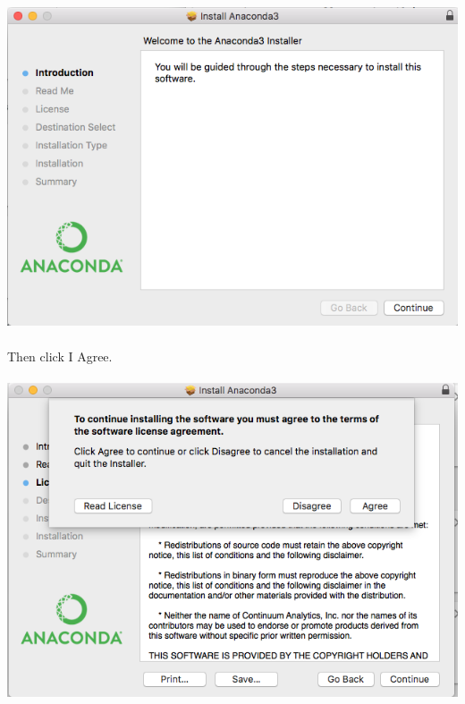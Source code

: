 \documentclass[]{article}
\begin{document}
\paragraph{}
\begin{centering}
    \centerline{\includegraphics[scale=0.5]{Screenshot_5.png}}
\end{centering}

\clearpage
\paragraph{}
Then click I Agree.
\paragraph{}
\begin{centering}
    \centerline{\includegraphics[scale=0.5]{Screenshot_6.png}}
\end{centering}
\end{document}
